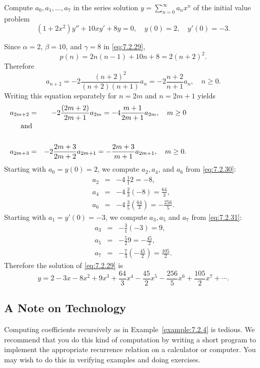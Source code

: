 \documentclass{ximera}
\begin{document}
\begin{example}\label{example:7.2.4}
Compute  $a_0, a_1, \dots, a_7$  in the series solution
$y=\sum_{n=0}^\infty a_nx^n$ of the initial value problem
\begin{equation}\label{eq:7.2.29}
(1+2x^2)y''+10xy'+8y=0,\quad y(0)=2,\quad y'(0)=-3.
\end{equation}
\begin{explanation}
Since $\alpha=2$, $\beta=10$, and $\gamma=8$ in \eqref{eq:7.2.29},
$$
p(n)=2n(n-1)+10n+8=2(n+2)^2.
$$
 Therefore
$$
a_{n+2}=-2\frac{(n+2)^2}{(n+2)(n+1)}a_n=-2\frac{n+2}{n+1}a_n,\quad n\geq0.
$$
Writing this equation separately for $n=2m$  and $n=2m+1$ yields
\begin{eqnarray}
a_{2m+2}&=&-2\frac{(2m+2)}{2m+1}a_{2m}=-4\frac{m+1}{2m+1}a_{2m},\quad m\geq
0\label{eq:7.2.30}\\
\noalign{\mbox{and}}\nonumber\\
a_{2m+3}&=&-2\frac{2m+3}{2m+2}a_{2m+1}=-\frac{2m+3}{m+1}a_{2m+1},\quad m\geq0.
\label{eq:7.2.31}
\end{eqnarray}
Starting with  $a_0=y(0)=2$, we compute $a_2, a_4$, and $a_6$ from
\eqref{eq:7.2.30}:
\begin{eqnarray*}
a_2&=&-4\,\frac{1}{1}2=-8,\\
a_4&=&-4\,\frac{2}{3}(-8)=\frac{64}{3},\\
a_6&=&-4\,\frac{3}{5}\left(\frac{64}{3}\right)=-\frac{256}{5}.
\end{eqnarray*}
Starting with $a_1=y'(0)=-3$, we compute $a_3,a_5$ and $a_7$ from
\eqref{eq:7.2.31}:
\begin{eqnarray*}
a_3&=&-\frac{3}{1}(-3)=9,\\
a_5&=&-\frac{5}{2}9=-\frac{45}{2},\\
a_7&=&-\frac{7}{3}\left(-\frac{45}{2}\right)=\frac{105}{2}.
\end{eqnarray*}
Therefore the solution of \eqref{eq:7.2.29} is
$$
y=2-3x-8x^2+9x^3+\frac{64}{3}x^4-\frac{45}{2}x^5-\frac{256}{5}
x^6+\frac{105}{2}x^7+\cdots .
$$
\end{explanation}
\end{example}


\subsection*{A Note on Technology}

Computing coefficients recursively as in Example~\ref{example:7.2.4} is
tedious. We recommend that you do this kind of computation by writing
a short program to implement the appropriate recurrence relation on a
calculator or computer. You may wish to do this in
verifying examples and doing exercises. %
\end{document}
